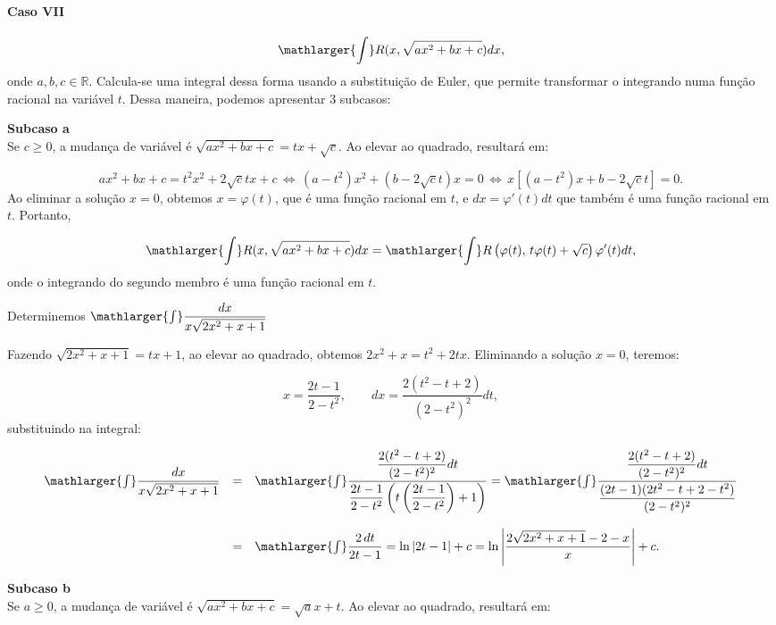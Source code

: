 \cleardoublepage\documentclass[../main.tex]{subfiles}
\begin{document}
\paragraph*{Caso VII}
\[ \mathlarger{\int} R(x, \sqrt{ax^2+bx+c} )dx, \]
onde \(a,b,c\in \mathbb{R}\). Calcula-se uma integral dessa forma usando a substituição de Euler, que permite transformar o integrando numa função racional na variável \(t\). Dessa maneira, podemos apresentar 3 subcasos:

\textbf{Subcaso a}\\

Se \(c\geq 0\), a mudança de variável é \(\sqrt{ax^2+bx+c}=tx+\sqrt{c}\). Ao elevar ao quadrado, resultará em:

\[ ax^2+bx+c=t^2x^2+2\sqrt{c} tx+c\,\Leftrightarrow\, (a-t^2)x^2+(b-2\sqrt{c}t)x =0\,\Leftrightarrow\, x\left[ (a-t^2)x+b-2\sqrt{c}t \right]=0. \]
Ao eliminar a solução \(x=0\), obtemos \(x=\varphi(t)\), que é uma função racional em \(t\), e \(dx=\varphi'(t) dt\) que também é uma função racional em \(t\). Portanto,

\[ \mathlarger{\int} R(x, \sqrt{ax^2+bx+c} )dx = \mathlarger{\int} R\left(\varphi(t),\, t\varphi(t)+\sqrt{c} \right)\varphi'(t)dt, \]
onde o integrando do segundo membro é uma função racional em \(t\).
\begin{ex}
Determinemos \(\mathlarger{\int} \dfrac{dx}{x\sqrt{2x^2+x+1}}\)

\begin{solution}
Fazendo \(\sqrt{2x^2+x+1}=tx+1\), ao elevar ao quadrado, obtemos \(2x^2+x=t^2+2tx\). Eliminando a solução \(x=0\), teremos:

\[ x=\dfrac{2t-1}{2-t^2},\qquad dx=\dfrac{2(t^2-t+2)}{(2-t^2)^2}dt, \]
substituindo na integral:

\[ \begin{array}{rcl} \mathlarger{\int} \dfrac{dx}{x\sqrt{2x^2+x+1}} &=& \mathlarger{\int} \dfrac{\dfrac{2(t^2-t+2)}{(2-t^2)^2}dt}{\dfrac{2t-1}{2-t^2}\left(t\left( \dfrac{2t-1}{2-t^2}\right)+1\right)} = \mathlarger{\int} \dfrac{\dfrac{2(t^2-t+2)}{(2-t^2)^2}dt}{\dfrac{(2t-1)(2t^2-t+2-t^2)}{(2-t^2)^2}}\\ \\ &=& \mathlarger{\int} \dfrac{2\,dt}{2t-1} = \ln|2t-1|+c = \ln \left|\dfrac{2\sqrt{2x^2+x+1} -2-x}{x} \right|+c. \end{array} \]
\end{solution}
\end{ex}

\textbf{Subcaso b}\\
Se \(a\geq 0\), a mudança de variável é \(\sqrt{ax^2+bx+c}=\sqrt{a}x+t\). Ao elevar ao quadrado, resultará em:
\end{document}
